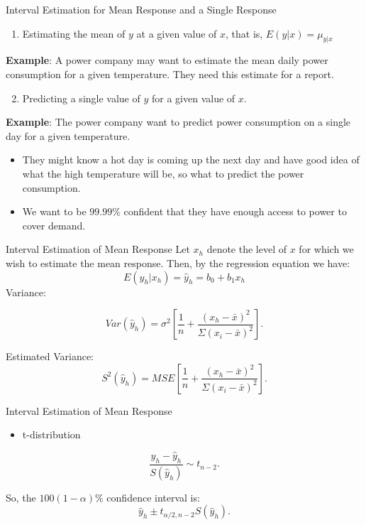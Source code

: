 \documentclass[
  ignorenonframetext,
]{beamer}
\providecommand{\tightlist}{%
  \setlength{\itemsep}{0pt}\setlength{\parskip}{0pt}}
\begin{document}
\begin{frame}{Interval Estimation for Mean Response and a Single
Response}
\protect\hypertarget{interval-estimation-for-mean-response-and-a-single-response}{}
\begin{enumerate}
\tightlist
\item
  Estimating the mean of \(y\) at a given value of \(x\), that is,
  \(E(y|x)=\mu_{y|x}\)
\end{enumerate}

\textbf{Example}: A power company may want to estimate the mean daily
power consumption for a given temperature. They need this estimate for a
report.

\begin{enumerate}
\setcounter{enumi}{1}
\tightlist
\item
  Predicting a single value of \(y\) for a given value of \(x\).
\end{enumerate}

\textbf{Example}: The power company want to predict power consumption on
a single day for a given temperature.

\begin{itemize}
\tightlist
\item
  They might know a hot day is coming up the next day and have good idea
  of what the high temperature will be, so what to predict the power
  consumption.
\item
  We want to be \(99.99\%\) confident that they have enough access to
  power to cover demand.
\end{itemize}
\end{frame}

\begin{frame}{Interval Estimation of Mean Response}
\protect\hypertarget{interval-estimation-of-mean-response}{}
Let \(x_h\) denote the level of \(x\) for which we wish to estimate the
mean response. Then, by the regression equation we have:
\[E(y_h|x_h)=\hat{y}_h=b_0+b_1x_h\] Variance:

\[Var(\hat{y}_h)=\sigma^2\left[\frac{1}{n}+\frac{(x_h-\bar{x})^2}{\Sigma(x_i-\bar{x})^2}\right].\]

Estimated Variance:
\[S^2(\hat{y}_h)=MSE\left[\frac{1}{n}+\frac{(x_h-\bar{x})^2}{\Sigma(x_i-\bar{x})^2}\right].\]
\end{frame}

\begin{frame}{Interval Estimation of Mean Response}
\protect\hypertarget{interval-estimation-of-mean-response-1}{}
\begin{itemize}
\tightlist
\item
  t-distribution
\end{itemize}

\[\frac{y_h-\hat{y}_h}{S(\hat{y}_h)}\sim t_{n-2}.\]

So, the \(100(1-\alpha)\%\) confidence interval is:
\[\hat{y}_h\pm t_{\alpha/2, n-2}S(\hat{y}_h).\]
\end{frame}
\end{document}
